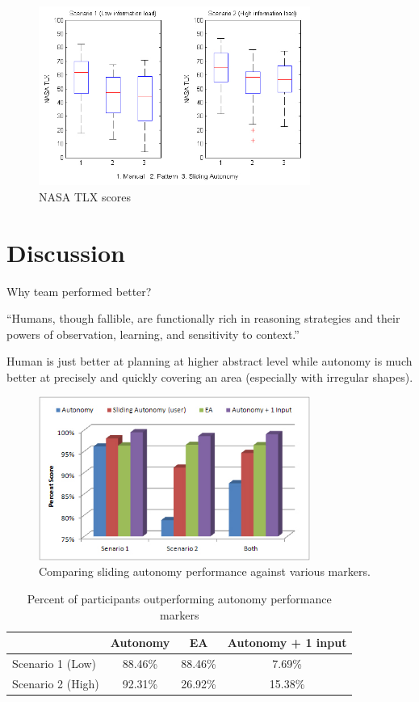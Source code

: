 \documentclass[journal]{IEEEtran}
\begin{document}
\begin{figure}
\centering
\includegraphics[width=3.5in]{NASATLXBoxPlot.JPG}
\caption{NASA TLX scores}
\label{NASATLX}
\end{figure}




\section{Discussion} 
\label{sec:Discussion}

Why team performed better?

``Humans, though fallible, are functionally rich in reasoning strategies and their powers of observation, learning, and sensitivity to context.'' ~\cite{Bradshaw2013Seven}

Human is just better at planning at higher abstract level while autonomy is much better at precisely and quickly covering an area (especially with irregular shapes).

\begin{figure}
\centering
\includegraphics[width=3.5in]{PerformanceMarkers.JPG}
\caption{Comparing sliding autonomy performance against various markers.}
\label{PerformanceMarkers}
\end{figure}



\begin{table}
\caption{Percent of participants outperforming autonomy performance markers}
	\centering
		\begin{tabular}
			{|l|c|c|c|}
			\hline
			 & Autonomy & EA & Autonomy + 1 input \\
			\hline
			Scenario 1 (Low) & 88.46\% & 88.46\% & 7.69\% \\
			\hline
			Scenario 2 (High) & 92.31\% & 26.92\% & 15.38\% \\
			\hline			
		\end{tabular}
\label{CompareToMarkers}
\end{table}
\end{document}
